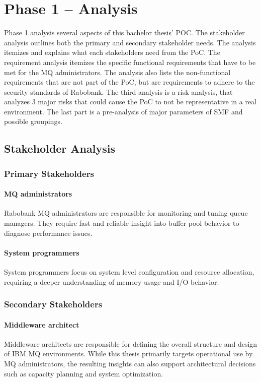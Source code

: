 \chapter{Phase 1 – Analysis}
\label{ch:phase1} 

Phase 1 analysis several aspects of this bachelor thesis' POC. The stakeholder analysis outlines both the primary and secondary stakeholder needs. The analysis itemizes and explains what each stakeholders need from the PoC. The requirement analysis itemizes the specific functional requirements that have to be met for the MQ administrators. The analysis also lists the non-functional requirements that are not part of the PoC, but are requirements to adhere to the security standards of Rabobank. The third analysis is a risk analysis, that analyzes 3 major risks that could cause the PoC to not be representative in a real environment. The last part is a pre-analysis of major parameters of SMF and possible groupings. 


\section{Stakeholder Analysis}

\subsection{Primary Stakeholders}
\subsubsection{MQ administrators}
Rabobank MQ administrators are responsible for monitoring and tuning queue managers. They require fast and reliable insight into buffer pool behavior to diagnose performance issues.
\subsubsection{System programmers}
System programmers focus on system level configuration and resource allocation, requiring a deeper understanding of memory usage and I/O behavior.


\subsection{Secondary Stakeholders}
\subsubsection{Middleware architect}
Middleware architects are responsible for defining the overall structure and design of IBM MQ environments. While this thesis primarily targets operational use by MQ administrators, the resulting insights can also support architectural decisions such as capacity planning and system optimization.
